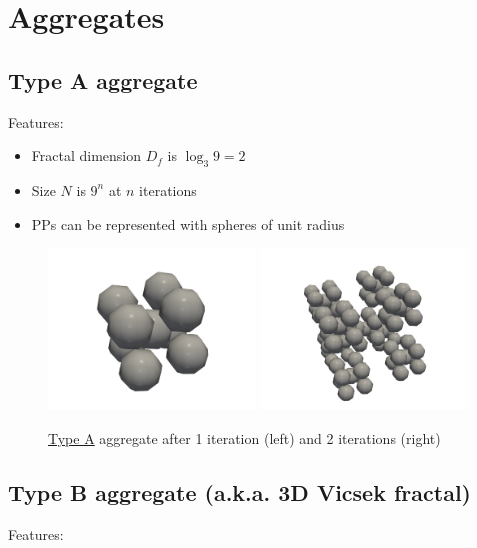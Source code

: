 \documentclass{article}
\begin{document}
\section*{Aggregates}

\subsection*{Type A aggregate}

Features:

\begin{itemize}
	\item Fractal dimension $D_f$ is $\log_{3}{9}=2$
	\item Size $N$ is $9^{n}$ at $n$ iterations
	\item PPs can be represented with spheres of unit radius
\end{itemize}

\begin{figure}[htp]
\includegraphics[width=0.49\textwidth]{resources/type-a-img-1.png}
\includegraphics[width=0.49\textwidth]{resources/type-a-img-2.png}
\caption*{\underline{Type A} aggregate after 1 iteration (left) and 2 iterations (right)}
\end{figure}

\subsection*{Type B aggregate (a.k.a. 3D Vicsek fractal)}

Features:
\end{document}
